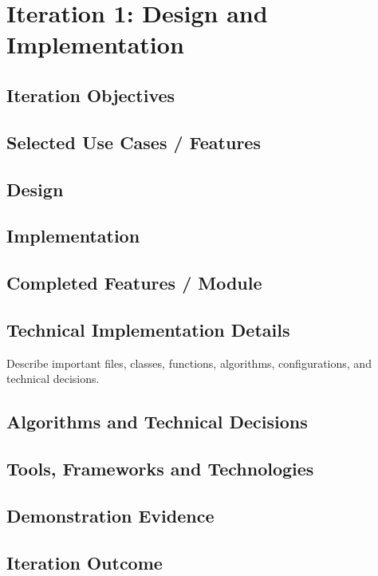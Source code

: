\chapter{Iteration 1: Design and Implementation}
\section{Iteration Objectives}
\section{Selected Use Cases / Features}
\section{Design}
\section{Implementation}
\section{Completed Features / Module}
\section{Technical Implementation Details}
Describe important files, classes, functions, algorithms, configurations, and technical decisions.
\section{Algorithms and Technical Decisions}
\section{Tools, Frameworks and Technologies}
\section{Demonstration Evidence}
\section{Iteration Outcome}
